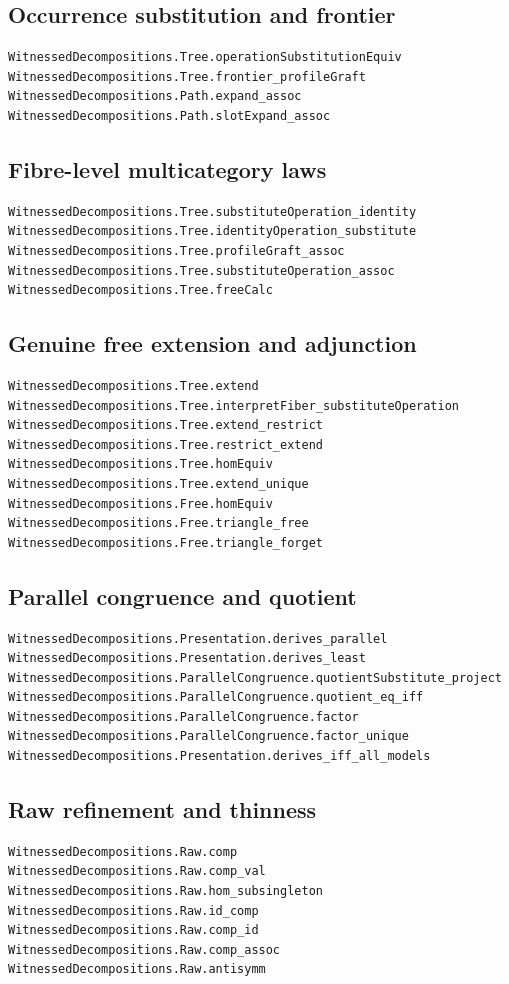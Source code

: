 \documentclass[11pt]{article}
\begin{document}
\subsection{Occurrence substitution and frontier}
\begin{verbatim}
WitnessedDecompositions.Tree.operationSubstitutionEquiv
WitnessedDecompositions.Tree.frontier_profileGraft
WitnessedDecompositions.Path.expand_assoc
WitnessedDecompositions.Path.slotExpand_assoc
\end{verbatim}
\subsection{Fibre-level multicategory laws}
\begin{verbatim}
WitnessedDecompositions.Tree.substituteOperation_identity
WitnessedDecompositions.Tree.identityOperation_substitute
WitnessedDecompositions.Tree.profileGraft_assoc
WitnessedDecompositions.Tree.substituteOperation_assoc
WitnessedDecompositions.Tree.freeCalc
\end{verbatim}
\subsection{Genuine free extension and adjunction}
\begin{verbatim}
WitnessedDecompositions.Tree.extend
WitnessedDecompositions.Tree.interpretFiber_substituteOperation
WitnessedDecompositions.Tree.extend_restrict
WitnessedDecompositions.Tree.restrict_extend
WitnessedDecompositions.Tree.homEquiv
WitnessedDecompositions.Tree.extend_unique
WitnessedDecompositions.Free.homEquiv
WitnessedDecompositions.Free.triangle_free
WitnessedDecompositions.Free.triangle_forget
\end{verbatim}
\subsection{Parallel congruence and quotient}
\begin{verbatim}
WitnessedDecompositions.Presentation.derives_parallel
WitnessedDecompositions.Presentation.derives_least
WitnessedDecompositions.ParallelCongruence.quotientSubstitute_project
WitnessedDecompositions.ParallelCongruence.quotient_eq_iff
WitnessedDecompositions.ParallelCongruence.factor
WitnessedDecompositions.ParallelCongruence.factor_unique
WitnessedDecompositions.Presentation.derives_iff_all_models
\end{verbatim}
\subsection{Raw refinement and thinness}
\begin{verbatim}
WitnessedDecompositions.Raw.comp
WitnessedDecompositions.Raw.comp_val
WitnessedDecompositions.Raw.hom_subsingleton
WitnessedDecompositions.Raw.id_comp
WitnessedDecompositions.Raw.comp_id
WitnessedDecompositions.Raw.comp_assoc
WitnessedDecompositions.Raw.antisymm
\end{verbatim}
\end{document}
